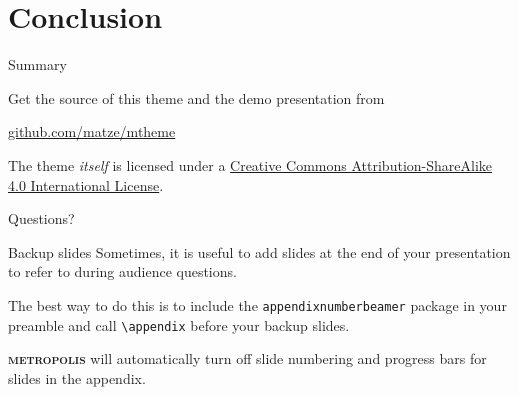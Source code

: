 \documentclass{beamer}
\newcommand{\themename}{\textbf{\textsc{metropolis}}\xspace}
\begin{document}
\section{Conclusion}

\begin{frame}{Summary}
	
	Get the source of this theme and the demo presentation from
	
	\begin{center}\url{github.com/matze/mtheme}\end{center}
	
	The theme \emph{itself} is licensed under a
	\href{http://creativecommons.org/licenses/by-sa/4.0/}{Creative Commons
		Attribution-ShareAlike 4.0 International License}.
	
	\begin{center}\ccbysa\end{center}
	
\end{frame}

{
	\begin{frame}[standout]
		Questions?
	\end{frame}
}

\appendix

\begin{frame}[fragile]{Backup slides}
	Sometimes, it is useful to add slides at the end of your presentation to
	refer to during audience questions.
	
	The best way to do this is to include the \verb|appendixnumberbeamer|
	package in your preamble and call \verb|\appendix| before your backup slides.
	
	\themename will automatically turn off slide numbering and progress bars for
	slides in the appendix.
\end{frame}
\end{document}
